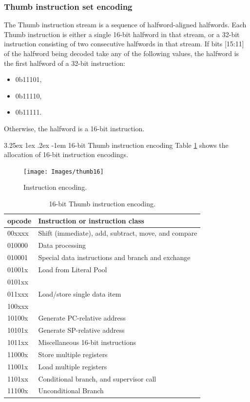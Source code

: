 \documentclass{report}
\makeatletter
\renewcommand\paragraph{\@startsection{paragraph}{5}{\z@}%
	{3.25ex \@plus1ex \@minus.2ex}%
	{-1em}%
	{\normalfont\normalsize\bfseries}}
\makeatother
\begin{document}
			\subsubsection{Thumb instruction set encoding}
			\par The Thumb instruction stream is a sequence of halfword-aligned halfwords. Each Thumb instruction is either a single 16-bit halfword in that stream, or a 32-bit instruction consisting of two consecutive halfwords	in that stream.
			If bits [15:11] of the halfword being decoded take any of the following values, the halfword is the first	halfword of a 32-bit instruction:
			\begin{itemize}
				\item 0b11101,
				\item 0b11110,
				\item 0b11111.
			\end{itemize}
			\par Otherwise, the halfword is a 16-bit instruction.
			
			
			\paragraph{16-bit Thumb instruction encoding} Table \ref{tab:thumb16} shows the allocation of 16-bit instruction encodings.
			
			\begin{figure} [H]
				\centering
				\texttt{[image: Images/thumb16]}
				\caption{Instruction encoding.}
				\label{fig:thumb16}
			\end{figure}
			
			\begin{table}[H]
				\centering
				\caption{16-bit Thumb instruction encoding.}
				\label{tab:thumb16}
				\begin{tabular}{l|l}
					\hline 
					\textbf{opcode} & \textbf{Instruction or instruction class} \\ \hline
					00xxxx & Shift (immediate), add, subtract, move, and compare \\
					010000 & Data processing \\
					010001 & Special data instructions and branch and exchange \\
					01001x & Load from Literal Pool \\
					0101xx & \multirow{3}{*}{Load/store single data item} \\
					011xxx &  \\
					100xxx &  \\
					10100x & Generate PC-relative address \\
					10101x & Generate SP-relative address \\
					1011xx & Miscellaneous 16-bit instructions \\
					11000x & Store multiple registers \\
					11001x & Load multiple registers \\
					1101xx & Conditional branch, and supervisor call \\
					11100x & Unconditional Branch \\
					\hline
				\end{tabular}
			\end{table}
			
\end{document}
